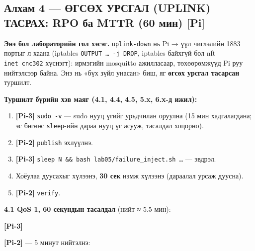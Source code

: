 \hypertarget{ux430ux43bux445ux430ux43c-4-ux4e9ux433ux441ux4e9ux445-ux443ux440ux441ux433ux430ux43b-uplink-ux442ux430ux441ux440ux430ux445-rpo-ux431ux430-mttr-60-ux43cux438ux43d-pi}{%
\subsection{Алхам 4 --- ӨГСӨХ УРСГАЛ (UPLINK) ТАСРАХ: RPO ба MTTR (60 мин) {[}Pi{]}}\label{ux430ux43bux445ux430ux43c-4-ux4e9ux433ux441ux4e9ux445-ux443ux440ux441ux433ux430ux43b-uplink-ux442ux430ux441ux440ux430ux445-rpo-ux431ux430-mttr-60-ux43cux438ux43d-pi}}

\textbf{Энэ бол лабораторийн гол хэсэг.} \texttt{uplink-down} нь Pi → үүл чиглэлийн 1883 портыг л хаана (iptables \texttt{OUTPUT\ \ldots{}\ -j\ DROP}, iptables байхгүй бол nft \texttt{inet\ cnc302} хүснэгт): ирмэгийн mosquitto ажилласаар, төхөөрөмжүүд Pi руу нийтэлсээр байна. Энэ нь «бүх зүйл унасан» биш, яг \textbf{өгсөх урсгал тасарсан} туршилт.

\textbf{Туршилт бүрийн хэв маяг (4.1, 4.4, 4.5, 5.x, 6.x-д ижил):}

\begin{enumerate}
\def\labelenumi{\arabic{enumi}.}
\tightlist
\item
  \textbf{{[}Pi-3{]}} \texttt{sudo\ -v} --- sudo нууц үгийг урьдчилан оруулна (15 мин хадгалагдана; эс бөгөөс \texttt{sleep}-ийн дараа нууц үг асууж, тасалдал хоцорно).
\item
  \textbf{{[}Pi-2{]}} \texttt{publish} эхлүүлнэ.
\item
  \textbf{{[}Pi-3{]}} \texttt{sleep\ N\ \&\allowbreak{}\&\allowbreak{}\ bash\ lab05/\allowbreak{}failure\_\allowbreak{}inject.\allowbreak{}sh\ \ldots{}} --- эвдрэл.
\item
  Хоёулаа дуусахыг хүлээнэ, \textbf{30 сек} нэмж хүлээнэ (дараалал урсаж дуусна).
\item
  \textbf{{[}Pi-2{]}} \texttt{verify}.
\end{enumerate}

\textbf{4.1 QoS 1, 60 секундын тасалдал} (нийт ≈ 5.5 мин):

\textbf{{[}Pi-3{]}}

\begin{Shaded}
\begin{Highlighting}[]
\end{Highlighting}
\end{Shaded}

\textbf{{[}Pi-2{]}} --- 5 минут нийтэлнэ:


